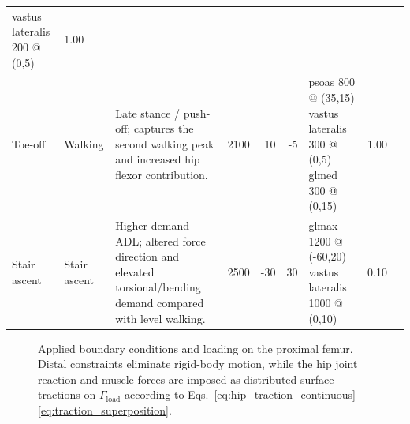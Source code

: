 \begin{table}[!htbp]
\begin{tabularx}{\textwidth}{@{} l l >{\raggedright\arraybackslash}X r r r >{\raggedright\arraybackslash}X r l @{}}
vastus lateralis 200 @ (0,5)
& 1.00 & \cite{Bergmann2010_RealisticLoadsHipImplants,Bergmann2016_StandardizedLoadsHipImplants} \\
Toe-off & Walking & Late stance / push-off; captures the second walking peak and increased hip flexor contribution. & 2100 & 10 & -5 &
psoas 800 @ (35,15)\newline
vastus lateralis 300 @ (0,5)\newline
glmed 300 @ (0,15)
& 1.00 & \cite{Bergmann2010_RealisticLoadsHipImplants,Bergmann2016_StandardizedLoadsHipImplants} \\
Stair ascent & Stair ascent & Higher-demand ADL; altered force direction and elevated torsional/bending demand compared with level walking. & 2500 & -30 & 30 &
glmax 1200 @ (-60,20)\newline
vastus lateralis 1000 @ (0,10)
& 0.10 & \cite{Bergmann2010_RealisticLoadsHipImplants,Bergmann2016_StandardizedLoadsHipImplants} \\
\bottomrule
\end{tabularx}
\end{table}

\begin{figure}
    \centering
    \caption{Applied boundary conditions and loading on the proximal femur. Distal constraints eliminate rigid-body motion, while the hip joint reaction and muscle forces are imposed as distributed surface tractions on $\Gamma_{\mathrm{load}}$ according to Eqs.~\eqref{eq:hip_traction_continuous}--\eqref{eq:traction_superposition}.}
    \label{fig:femur_loads}
\end{figure}
